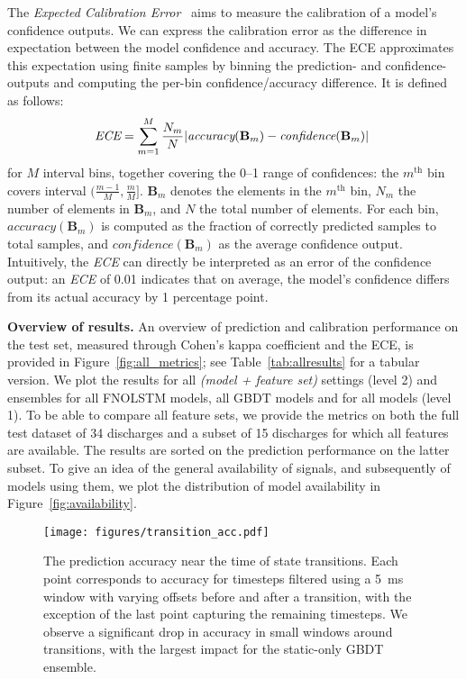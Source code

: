 The \textit{Expected Calibration Error}~\cite{degroot1983,naeini2015} aims to measure the calibration of a model's confidence outputs. We can express the calibration error as the difference in expectation between the model confidence and accuracy. The ECE approximates this expectation using finite samples by binning the prediction- and confidence-outputs and computing the per-bin confidence/accuracy difference. It is defined as follows: 
\begin{align}
    \hspace{-.11cm}\textit{ECE} = \sum_{m=1}^M \frac{N_m}{N}|\textit{accuracy}(\mathbf{B}_m) - \textit{confidence}(\mathbf{B}_m)|
\end{align}
for $M$ interval bins, together covering the \numrange{0}{1} range of confidences: the $m^\text{th}$ bin covers interval ${(\frac{m-1}{M}, \frac{m}{M}]}$. $\mathbf{B}_m$ denotes the elements in the $m^\text{th}$ bin, $N_m$ the number of elements in $\mathbf{B}_m$, and $N$ the total number of elements. For each bin, $\textit{accuracy}(\mathbf{B}_m)$ is computed as the fraction of correctly predicted samples to total samples, and $\textit{confidence}(\mathbf{B}_m)$ as the average confidence output. Intuitively, the \textit{ECE} can directly be interpreted as an error of the confidence output: an \textit{ECE} of 0.01 indicates that on average, the model's confidence differs from its actual accuracy by 1 percentage point.


\textbf{Overview of results.} An overview of prediction and calibration performance on the test set, measured through Cohen's kappa coefficient and the ECE, is provided in Figure~\ref{fig:all_metrics}; see Table~\ref{tab:allresults} for a tabular version. We plot the results for all \textit{(model + feature set)} settings (level 2) and ensembles for all FNOLSTM models, all GBDT models and for all models (level 1). To be able to compare all feature sets, we provide the metrics on both the full test dataset of 34 discharges and a subset of 15 discharges for which all features are available. The results are sorted on the prediction performance on the latter subset. To give an idea of the  general availability of signals, and subsequently of models using them, we plot the distribution of model availability in Figure~\ref{fig:availability}.

\begin{figure}[t]
\begin{center}\texttt{[image: figures/transition\_acc.pdf]}\end{center}
    \caption{The prediction accuracy near the time of state transitions. Each point corresponds to accuracy for timesteps filtered using a \SI{5}{\milli\second} window with varying offsets before and after a transition, with the exception of the last point capturing the remaining timesteps. We observe a significant drop in accuracy in small windows around transitions, with the largest impact for the static-only GBDT ensemble.}
    \label{fig:transition_acc}%
\end{figure}


